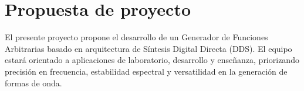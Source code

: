 

%
%

\newpage

%
%

\renewcommand{\tablename}{Tabla}

\section{Propuesta de proyecto}
El presente proyecto propone el desarrollo de un Generador de Funciones Arbitrarias basado en arquitectura de Síntesis Digital Directa (DDS). El equipo estará orientado a aplicaciones de laboratorio, desarrollo y enseñanza, priorizando precisión en frecuencia, estabilidad espectral y versatilidad en la generación de formas de onda.

